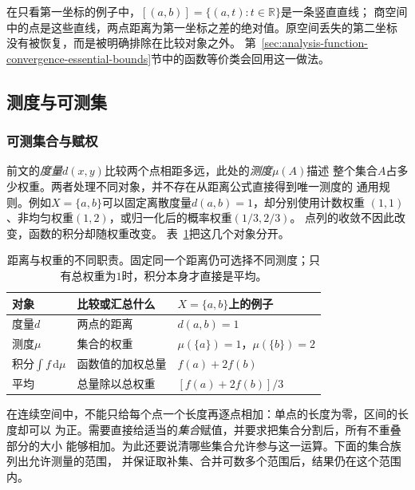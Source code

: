 在只看第一坐标的例子中，$[(a,b)]=\{(a,t):t\in\mathbb R\}$是一条竖直直线；
商空间中的点是这些直线，两点距离为第一坐标之差的绝对值。原空间丢失的第二坐标
没有被恢复，而是被明确排除在比较对象之外。
第~\ref{sec:analysis-function-convergence-essential-bounds}节中的函数等价类会回用这一做法。

\subsection{测度与可测集}
\subsubsection{可测集合与赋权}

前文的\emph{度量}$d(x,y)$比较两个点相距多远，此处的\emph{测度}$\mu(A)$描述
整个集合$A$占多少权重。两者处理不同对象，并不存在从距离公式直接得到唯一测度的
通用规则。例如$X=\{a,b\}$可以固定离散度量$d(a,b)=1$，却分别使用计数权重
$(1,1)$、非均匀权重$(1,2)$，或归一化后的概率权重$(1/3,2/3)$。
点列的收敛不因此改变，函数的积分却随权重改变。
表~\ref{tab:analysis-metric-measure-integral}把这几个对象分开。

\begin{table}[htbp]
 \centering\small
 \begin{tabularx}{\linewidth}{@{}lXX@{}}
 \toprule
 对象 & 比较或汇总什么 & $X=\{a,b\}$上的例子\\
 \midrule
 度量$d$ & 两点的距离 & $d(a,b)=1$\\
 测度$\mu$ & 集合的权重 & $\mu(\{a\})=1$，$\mu(\{b\})=2$\\
 积分$\int f\,\mathrm d\mu$ & 函数值的加权总量 & $f(a)+2f(b)$\\
 平均 & 总量除以总权重 & $[f(a)+2f(b)]/3$\\
 \bottomrule
 \end{tabularx}
 \caption{距离与权重的不同职责。固定同一个距离仍可选择不同测度；只有总权重为$1$时，积分本身才直接是平均。}
 \label{tab:analysis-metric-measure-integral}
\end{table}

在连续空间中，不能只给每个点一个长度再逐点相加：单点的长度为零，区间的长度却可以
为正。需要直接给适当的\emph{集合}赋值，并要求把集合分割后，所有不重叠部分的大小
能够相加。为此还要说清哪些集合允许参与这一运算。下面的集合族列出允许测量的范围，
并保证取补集、合并可数多个范围后，结果仍在这个范围内。


